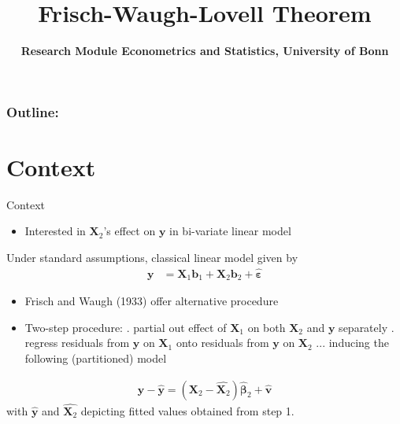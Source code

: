 \documentclass[xcolor=dvipsnames]{beamer}
\title[RM Econometrics and Statistics]{Frisch-Waugh-Lovell Theorem}
\author[Caroline, Sofia, Max]{ \textbf{Research Module Econometrics and Statistics, \newline University of Bonn}}
\institute{}
\begin{document}
\begin{frame}
  \titlepage
\end{frame}

\begin{frame}
\frametitle{\textbf{Outline:}}
\tableofcontents
\end{frame}


\section{Context}
\begin{frame}{Context}
\begin{itemize}
    \item Interested in $\mathbf{X}_2$'s effect on $\mathbf{y}$ in bi-variate linear model
\end{itemize}
Under standard assumptions, classical linear model given by
\begin{align*}
  \mathbf{y} &= \mathbf{X}_1\mathbf{b}_1+\mathbf{X}_2\mathbf{b}_2+\hat{\boldsymbol{\varepsilon}}
\end{align*}
\pause
\begin{itemize}
    \item Frisch and Waugh (1933) offer alternative procedure
    \item Two-step procedure:
    . partial out effect of $\mathbf{X}_1$ on both $\mathbf{X}_2$ and $\mathbf{y}$ separately
    . regress residuals from $\mathbf{y}$ on $\mathbf{X}_1$ onto residuals from $\mathbf{y}$ on $\mathbf{X}_2$
    \newline
    ... inducing the following (partitioned) model
\end{itemize}
\begin{align*}
    \mathbf{y}-\hat{\mathbf{y}} =
    (\mathbf{X}_2-\hat{\mathbf{X}_2})\hat{\boldsymbol{\beta}}_2 +
    \hat{\mathbf{v}}
\end{align*}
with $\hat{\mathbf{y}}$ and $\hat{\mathbf{X}_2}$ depicting fitted values obtained from step 1.

\end{frame}
\end{document}
